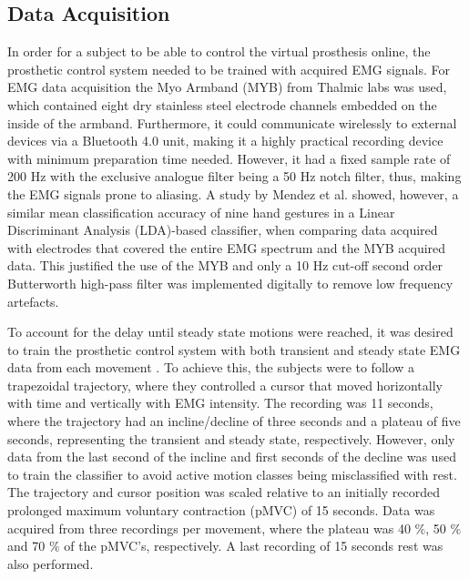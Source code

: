 \subsection{Data Acquisition}

In order for a subject to be able to control the virtual prosthesis online, the prosthetic control system needed to be trained with acquired EMG signals. For EMG data acquisition the Myo Armband (MYB) from Thalmic labs was used, which contained eight dry stainless steel electrode channels embedded on the inside of the armband. Furthermore, it could communicate wirelessly to external devices via a Bluetooth 4.0 unit, making it a highly practical recording device with minimum preparation time needed. However, it had a fixed sample rate of 200 Hz with the exclusive analogue filter being a 50 Hz notch filter, thus, making the EMG signals prone to aliasing. A study by Mendez et al. \cite{Mendez2017} showed, however, a similar mean classification accuracy of nine hand gestures in a Linear Discriminant Analysis (LDA)-based classifier, when comparing data acquired with electrodes that covered the entire EMG spectrum and the MYB acquired data. This justified the use of the MYB and only a 10 Hz cut-off second order Butterworth high-pass filter was implemented digitally to remove low frequency artefacts.

To account for the delay until steady state motions were reached, it was desired to train the prosthetic control system with both transient and steady state EMG data from each movement \cite{Boschmann2013}. To achieve this, the subjects were to follow a trapezoidal trajectory, where they controlled a cursor that moved horizontally with time and vertically with EMG intensity. The recording was 11 seconds, where the trajectory had an incline/decline of three seconds and a plateau of five seconds, representing the transient and steady state, respectively. However, only data from the last second of the incline and first seconds of the decline was used to train the classifier to avoid active motion classes being misclassified with rest. The trajectory and cursor position was scaled relative to an initially recorded prolonged maximum voluntary contraction (pMVC) of 15 seconds. Data was acquired from three recordings per movement, where the plateau was 40 $\%$, 50 $\%$ and 70 $\%$ of the pMVC's, respectively. A last recording of 15 seconds rest was also performed.


